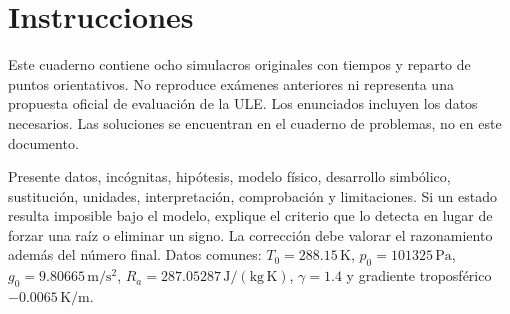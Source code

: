 
\renewcommand{\studiumvolumetype}{simulacros}

\frontmatter
\studiumreadingguide
\chapter*{Instrucciones}
Este cuaderno contiene ocho simulacros originales con tiempos y reparto de puntos orientativos. No reproduce exámenes anteriores ni representa una propuesta oficial de evaluación de la ULE. Los enunciados incluyen los datos necesarios. Las soluciones se encuentran en el cuaderno de problemas, no en este documento.

Presente datos, incógnitas, hipótesis, modelo físico, desarrollo simbólico, sustitución, unidades, interpretación, comprobación y limitaciones. Si un estado resulta imposible bajo el modelo, explique el criterio que lo detecta en lugar de forzar una raíz o eliminar un signo. La corrección debe valorar el razonamiento además del número final. Datos comunes: $T_0=288.15\,\mathrm K$, $p_0=101325\,\mathrm{Pa}$, $g_0=9.80665\,\mathrm{m/s^2}$, $R_a=287.05287\,\mathrm{J/(kg\,K)}$, $\gamma=1.4$ y gradiente troposférico $-0.0065\,\mathrm{K/m}$.
\tableofcontents
\mainmatter


